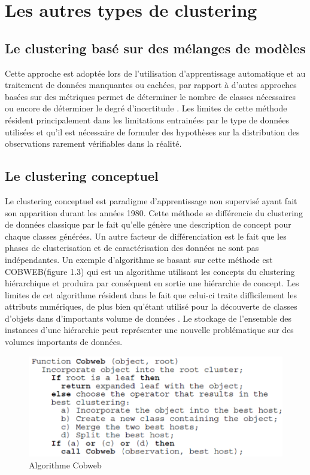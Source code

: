 \documentclass[memoire.tex]{subfiles}
\begin{document}
\section{Les autres types de clustering}
\subsection{Le clustering basé sur des mélanges de modèles}
Cette approche est adoptée lors de l'utilisation d'apprentissage automatique et au traitement de données manquantes ou cachées, par rapport à d'autes approches basées sur des métriques permet de déterminer le nombre de classes nécessaires  ou encore de déterminer le degré d'incertitude \cite{ref10}. Les limites de cette méthode résident principalement dans les limitations entrainées par le type de données utilisées et qu'il est nécessaire de formuler des hypothèses sur la distribution des observations rarement vérifiables dans la réalité.\cite{ref8}

\subsection{Le clustering conceptuel}
Le clustering conceptuel est paradigme d'apprentissage non supervisé ayant fait son apparition durant les années 1980. Cette méthode se différencie du clustering de données classique par le fait qu'elle génère une description de concept pour chaque classes générées. Un autre facteur de différenciation est le fait que les phases de clusterisation et de caractérisation des données ne sont pas indépendantes.\cite{ref11}
Un exemple d’algorithme se basant sur cette méthode est COBWEB(figure 1.3) qui est un algorithme utilisant les concepts du clustering hiérarchique et produira par conséquent en sortie une hiérarchie de concept. 
Les limites de cet algorithme résident dans le fait que celui-ci traite difficilement les attributs numériques\cite{ref8}, de plus bien qu’étant utilisé pour la découverte de classes d’objets dans d’importants volume de données 
\cite{ref14}. Le stockage de l'ensemble des instances d’une hiérarchie peut représenter une nouvelle problématique sur des volumes importants de données.
	\begin{figure}[h!]
		\centerline{\includegraphics[scale=0.7]{img/cobweb.png}}
		\caption{Algorithme Cobweb}
	\end{figure}
\end{document}
